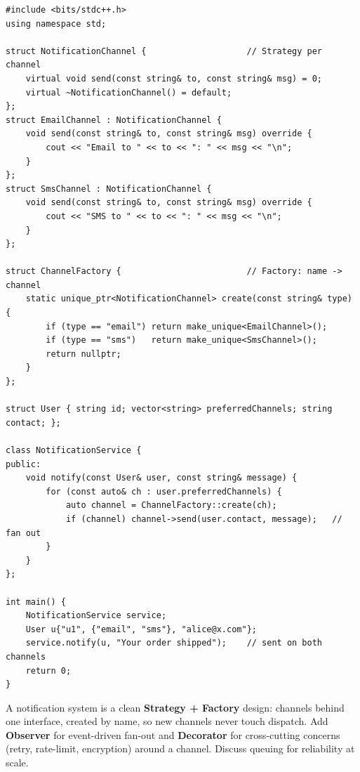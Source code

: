 \begin{lstlisting}
#include <bits/stdc++.h>
using namespace std;

struct NotificationChannel {                    // Strategy per channel
    virtual void send(const string& to, const string& msg) = 0;
    virtual ~NotificationChannel() = default;
};
struct EmailChannel : NotificationChannel {
    void send(const string& to, const string& msg) override {
        cout << "Email to " << to << ": " << msg << "\n";
    }
};
struct SmsChannel : NotificationChannel {
    void send(const string& to, const string& msg) override {
        cout << "SMS to " << to << ": " << msg << "\n";
    }
};

struct ChannelFactory {                         // Factory: name -> channel
    static unique_ptr<NotificationChannel> create(const string& type) {
        if (type == "email") return make_unique<EmailChannel>();
        if (type == "sms")   return make_unique<SmsChannel>();
        return nullptr;
    }
};

struct User { string id; vector<string> preferredChannels; string contact; };

class NotificationService {
public:
    void notify(const User& user, const string& message) {
        for (const auto& ch : user.preferredChannels) {
            auto channel = ChannelFactory::create(ch);
            if (channel) channel->send(user.contact, message);   // fan out
        }
    }
};

int main() {
    NotificationService service;
    User u{"u1", {"email", "sms"}, "alice@x.com"};
    service.notify(u, "Your order shipped");    // sent on both channels
    return 0;
}
\end{lstlisting}

\begin{takeawaybox}
A notification system is a clean \textbf{Strategy + Factory} design:
channels behind one interface, created by name, so new channels never
touch dispatch. Add \textbf{Observer} for event-driven fan-out and
\textbf{Decorator} for cross-cutting concerns (retry, rate-limit,
encryption) around a channel. Discuss queuing for reliability at scale.
\end{takeawaybox}
